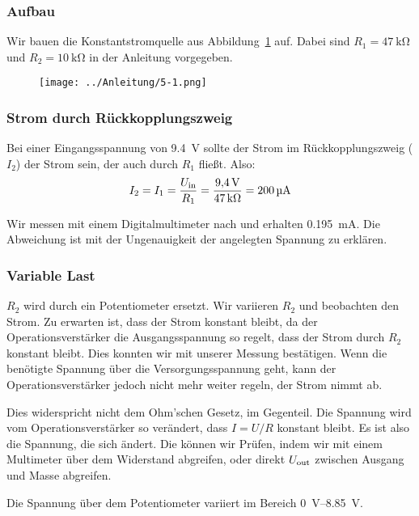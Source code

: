 \subsubsection{Aufbau}

Wir bauen die Konstantstromquelle aus Abbildung~\ref{fig:5-1} auf. Dabei sind
$R_1 = \SI{47}{\kilo\ohm}$ und $R_2 = \SI{10}{\kilo\ohm}$ in der Anleitung
vorgegeben.

\begin{figure}[htbp]
	\centering
	\texttt{[image: ../Anleitung/5-1.png]}
	\caption{%
		\cite[Abbildung~5.1]{physik313-Anleitung}
	}
	\label{fig:5-1}
\end{figure}

\subsubsection{Strom durch Rückkopplungszweig}

Bei einer Eingangsspannung von \SI{9.4}{\volt} sollte der Strom im
Rückkopplungszweig ($I_2$) der Strom sein, der auch durch $R_1$ fließt. Also:
\[
	I_2
	= I_1
	= \frac{U_\text{in}}{R_1}
	= \frac{\SI{9.4}\volt}{\SI{47}{\kilo\ohm}}
	= \SI{200}{\micro\ampere}
\]

Wir messen mit einem Digitalmultimeter nach und erhalten
\SI{.195}{\milli\ampere}. Die Abweichung ist mit der Ungenauigkeit der
angelegten Spannung zu erklären.

\subsubsection{Variable Last}

$R_2$ wird durch ein Potentiometer ersetzt. Wir variieren $R_2$ und beobachten
den Strom. Zu erwarten ist, dass der Strom konstant bleibt, da der
Operationsverstärker die Ausgangsspannung so regelt, dass der Strom durch $R_2$
konstant bleibt. Dies konnten wir mit unserer Messung bestätigen. Wenn die
benötigte Spannung über die Versorgungsspannung geht,
kann der Operationsverstärker jedoch nicht mehr weiter regeln, der Strom nimmt
ab.

Dies widerspricht nicht dem Ohm'schen Gesetz, im Gegenteil. Die Spannung wird
vom Operationsverstärker so verändert, dass $I = U/R$ konstant bleibt. Es ist
also die Spannung, die sich ändert. Die können wir Prüfen, indem wir mit einem
Multimeter über dem Widerstand abgreifen, oder direkt $U_\text{out}$ zwischen Ausgang
und Masse abgreifen.

Die Spannung über dem Potentiometer variiert im Bereich
\SIrange{0}{8.85}{\volt}.

